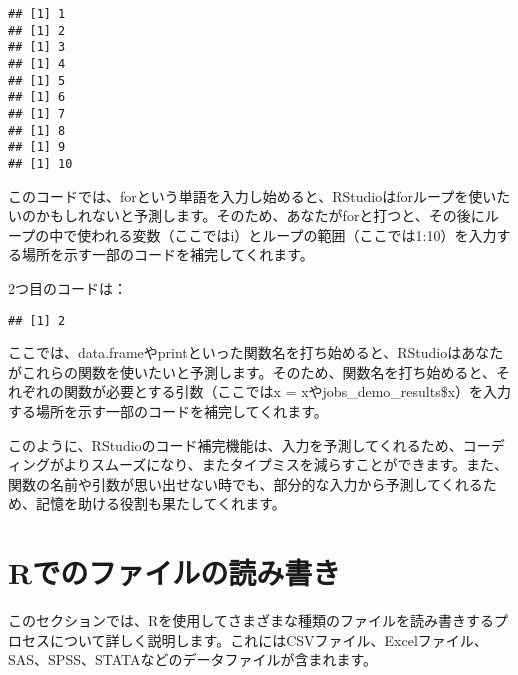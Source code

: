 \documentclass[
]{article}
\newenvironment{Shaded}{\begin{snugshade}}{\end{snugshade}}
\newcommand{\AttributeTok}[1]{\textcolor[rgb]{0.13,0.29,0.53}{#1}}
\newcommand{\CommentTok}[1]{\textcolor[rgb]{0.56,0.35,0.01}{\textit{#1}}}
\newcommand{\DecValTok}[1]{\textcolor[rgb]{0.00,0.00,0.81}{#1}}
\newcommand{\FunctionTok}[1]{\textcolor[rgb]{0.13,0.29,0.53}{\textbf{#1}}}
\newcommand{\NormalTok}[1]{#1}
\newcommand{\OtherTok}[1]{\textcolor[rgb]{0.56,0.35,0.01}{#1}}
\newcommand{\SpecialCharTok}[1]{\textcolor[rgb]{0.81,0.36,0.00}{\textbf{#1}}}
\begin{document}
\begin{verbatim}
## [1] 1
## [1] 2
## [1] 3
## [1] 4
## [1] 5
## [1] 6
## [1] 7
## [1] 8
## [1] 9
## [1] 10
\end{verbatim}

このコードでは、forという単語を入力し始めると、RStudioはforループを使いたいのかもしれないと予測します。そのため、あなたがforと打つと、その後にループの中で使われる変数（ここではi）とループの範囲（ここでは1:10）を入力する場所を示す一部のコードを補完してくれます。

2つ目のコードは：

\begin{Shaded}
\end{Shaded}

\begin{verbatim}
## [1] 2
\end{verbatim}

ここでは、data.frameやprintといった関数名を打ち始めると、RStudioはあなたがこれらの関数を使いたいと予測します。そのため、関数名を打ち始めると、それぞれの関数が必要とする引数（ここではx
=
xやjobs\_demo\_results\$x）を入力する場所を示す一部のコードを補完してくれます。

このように、RStudioのコード補完機能は、入力を予測してくれるため、コーディングがよりスムーズになり、またタイプミスを減らすことができます。また、関数の名前や引数が思い出せない時でも、部分的な入力から予測してくれるため、記憶を助ける役割も果たしてくれます。

\hypertarget{rux3067ux306eux30d5ux30a1ux30a4ux30ebux306eux8aadux307fux66f8ux304d}{%
\section{Rでのファイルの読み書き}\label{rux3067ux306eux30d5ux30a1ux30a4ux30ebux306eux8aadux307fux66f8ux304d}}

このセクションでは、Rを使用してさまざまな種類のファイルを読み書きするプロセスについて詳しく説明します。これにはCSVファイル、Excelファイル、SAS、SPSS、STATAなどのデータファイルが含まれます。
\end{document}
